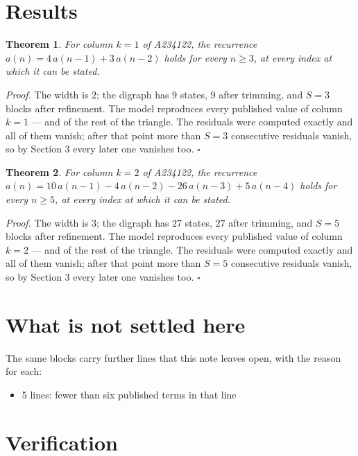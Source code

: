 \documentclass[11pt]{article}
\newtheorem{theorem}{Theorem}
\theoremstyle{definition}
\begin{document}
\section{Results}

\begin{theorem} For column $k = 1$ of A234122, the recurrence $a(n) = 4\,a(n-1) + 3\,a(n-2)$ holds for every $n \ge 3$, at every index at which it can be stated.\end{theorem}

{\itshape Proof.} The width is $2$; the digraph has $9$ states, $9$ after trimming, and $S = 3$ blocks after refinement. The model reproduces every published value of column $k = 1$ --- and of the rest of the triangle. The residuals were computed exactly and all of them vanish; after that point more than $S = 3$ consecutive residuals vanish, so by Section 3 every later one vanishes too. $\square$

\begin{theorem} For column $k = 2$ of A234122, the recurrence $a(n) = 10\,a(n-1) - 4\,a(n-2) - 26\,a(n-3) + 5\,a(n-4)$ holds for every $n \ge 5$, at every index at which it can be stated.\end{theorem}

{\itshape Proof.} The width is $3$; the digraph has $27$ states, $27$ after trimming, and $S = 5$ blocks after refinement. The model reproduces every published value of column $k = 2$ --- and of the rest of the triangle. The residuals were computed exactly and all of them vanish; after that point more than $S = 5$ consecutive residuals vanish, so by Section 3 every later one vanishes too. $\square$

\section{What is not settled here}

The same blocks carry further lines that this note leaves open, with the reason for each:

\begin{itemize}

\item 5 lines: fewer than six published terms in that line

\end{itemize}

\section{Verification}
\end{document}

